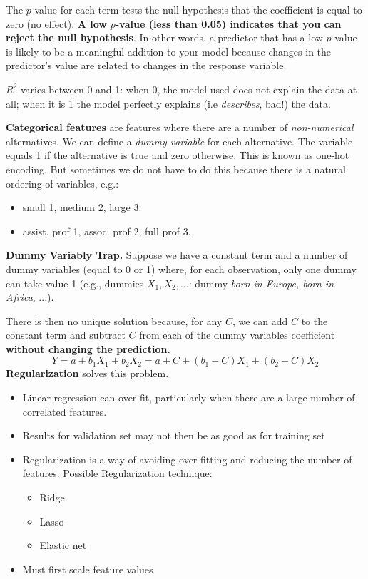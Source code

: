 The $p$-value for each term tests the null hypothesis that the coefficient is equal to zero (no effect). \textbf{A low }$p$\textbf{-value (less than 0.05) indicates that you can reject the null hypothesis}. In other words, a predictor that has a low $p$-value is likely to be a meaningful addition to your model because changes in the predictor's value are related to changes in the response variable.

$R^2$ varies between 0 and 1: when 0, the model used does not explain the data at all; when it is 1 the model perfectly explains (i.e \textit{describes}, bad!) the data. 

\textbf{Categorical features} are features where there are a number of \textit{non-numerical} alternatives. We can define a \textit{dummy variable} for each alternative. The variable equals 1 if the alternative is true and zero otherwise. This is known as one-hot encoding. But sometimes we do not have to do this because there is a natural ordering of variables, e.g.:
\begin{itemize}
    \item small 1, medium 2, large 3.
    \item assist. prof 1, assoc. prof 2, full prof 3.
\end{itemize}

\textbf{Dummy Variably Trap.} Suppose we have a constant term and a number of dummy variables (equal to 0 or 1) where, for each observation, only one dummy can take value 1 (e.g., dummies $X_{1},X_{2},\dotsc $: dummy \textit{born in Europe, born in Africa}, ...).

There is then no unique solution because, for any $C$, we can add $C$ to the constant term and subtract $C$ from each of the dummy variables coefficient \textbf{without changing the prediction.}
\begin{equation*}
    Y = a+b_{1} X_{1} +b_{2} X_{2} =a+C+(b_{1} -C) X_{1} +(b_{2} -C) X_{2}
\end{equation*}
\textbf{Regularization} solves this problem.
\begin{itemize}
    \item Linear regression can over-fit, particularly when there are a large number of correlated features.
    \item Results for validation set may not then be as good as for training set
    \item Regularization is a way of avoiding over fitting and reducing the number of features. Possible Regularization technique:
    \begin{itemize}
        \item Ridge 
        \item Lasso
        \item Elastic net
    \end{itemize}
    \item Must first scale feature values
\end{itemize}

